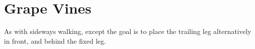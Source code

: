 \section{Grape Vines}
\label{sec:toe_stop/grape_vine}

As with sideways walking, except the goal is to place the trailing leg alternatively in front, and behind the fixed leg. 
